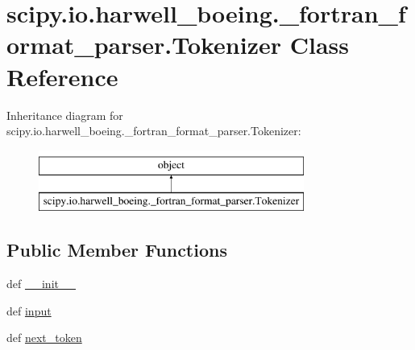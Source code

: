\hypertarget{classscipy_1_1io_1_1harwell__boeing_1_1__fortran__format__parser_1_1Tokenizer}{}\section{scipy.\+io.\+harwell\+\_\+boeing.\+\_\+fortran\+\_\+format\+\_\+parser.\+Tokenizer Class Reference}
\label{classscipy_1_1io_1_1harwell__boeing_1_1__fortran__format__parser_1_1Tokenizer}
Inheritance diagram for scipy.\+io.\+harwell\+\_\+boeing.\+\_\+fortran\+\_\+format\+\_\+parser.\+Tokenizer\+:\begin{figure}[H]
\begin{center}
\leavevmode
\includegraphics[height=2.000000cm]{classscipy_1_1io_1_1harwell__boeing_1_1__fortran__format__parser_1_1Tokenizer}
\end{center}
\end{figure}
\subsection*{Public Member Functions}
\begin{DoxyCompactItemize}
\item 
def \hyperlink{classscipy_1_1io_1_1harwell__boeing_1_1__fortran__format__parser_1_1Tokenizer_a7b63f33a55650efd352c0d6c90f7c8a9}{\+\_\+\+\_\+init\+\_\+\+\_\+}
\item 
def \hyperlink{classscipy_1_1io_1_1harwell__boeing_1_1__fortran__format__parser_1_1Tokenizer_ab467220b0e31ee4071852ba230025755}{input}
\item 
def \hyperlink{classscipy_1_1io_1_1harwell__boeing_1_1__fortran__format__parser_1_1Tokenizer_a2e2fa932f32243b5d4dd3f24d6222937}{next\+\_\+token}
\end{DoxyCompactItemize}
